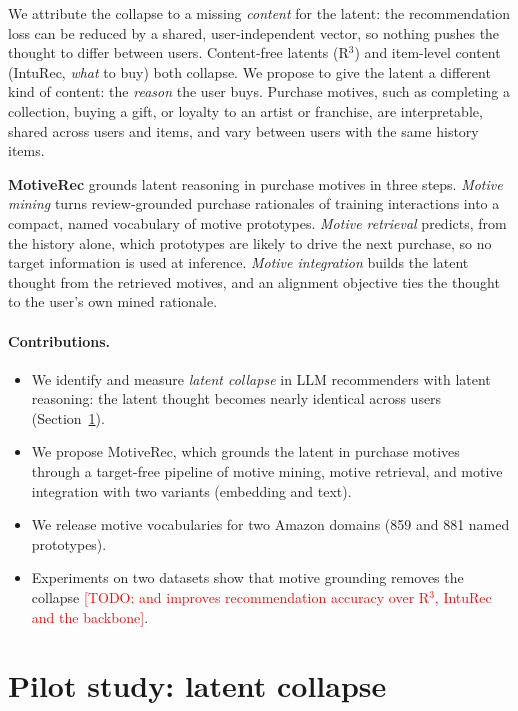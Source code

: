 \documentclass[10pt,twocolumn]{article}
\newcommand{\todo}[1]{\textcolor{red}{[TODO: #1]}}
\begin{document}
We attribute the collapse to a missing \emph{content} for the latent: the recommendation loss can be
reduced by a shared, user-independent vector, so nothing pushes the thought to differ between users.
Content-free latents (R$^3$) and item-level content (IntuRec, \emph{what} to buy) both collapse. We
propose to give the latent a different kind of content: the \emph{reason} the user buys. Purchase
motives, such as completing a collection, buying a gift, or loyalty to an artist or franchise, are
interpretable, shared across users and items, and vary between users with the same history items.

\textbf{MotiveRec} grounds latent reasoning in purchase motives in three steps. \emph{Motive mining}
turns review-grounded purchase rationales of training interactions into a compact, named vocabulary of
motive prototypes. \emph{Motive retrieval} predicts, from the history alone, which prototypes are likely
to drive the next purchase, so no target information is used at inference. \emph{Motive integration}
builds the latent thought from the retrieved motives, and an alignment objective ties the thought to the
user's own mined rationale.

\paragraph{Contributions.}
\begin{itemize}
\item We identify and measure \emph{latent collapse} in LLM recommenders with latent reasoning: the
latent thought becomes nearly identical across users (Section~\ref{sec:pilot}).
\item We propose MotiveRec, which grounds the latent in purchase motives through a target-free pipeline
of motive mining, motive retrieval, and motive integration with two variants (embedding and text).
\item We release motive vocabularies for two Amazon domains (859 and 881 named prototypes).
\item Experiments on two datasets show that motive grounding removes the collapse \todo{and improves
recommendation accuracy over R$^3$, IntuRec and the backbone}.
\end{itemize}

\section{Pilot study: latent collapse}\label{sec:pilot}
\end{document}
